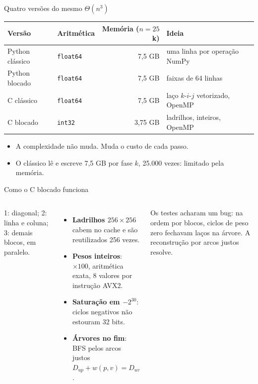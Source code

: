 \documentclass[10pt,aspectratio=169]{beamer}
\begin{document}
\begin{frame}{Quatro versões do mesmo \(\Theta(n^3)\)}
\centering
\begin{tabular}{llrl}
\toprule
Versão & Aritmética & Memória (\(n=25\)k) & Ideia \\
\midrule
Python clássico & \texttt{float64} & 7,5 GB & uma linha por operação NumPy \\
Python blocado & \texttt{float64} & 7,5 GB & faixas de 64 linhas \\
C clássico & \texttt{float64} & 7,5 GB & laço \(k\)-\(i\)-\(j\) vetorizado, OpenMP \\
\alert{C blocado} & \texttt{int32} & \alert{3,75 GB} & ladrilhos, inteiros, OpenMP \\
\bottomrule
\end{tabular}
\par\bigskip
\begin{itemize}
\item A complexidade não muda. Muda o custo de cada passo.
\item O clássico lê e escreve 7,5 GB por fase \(k\), 25.000 vezes: \alert{limitado pela memória}.
\end{itemize}
\end{frame}

\begin{frame}{Como o C blocado funciona}
\begin{columns}[T,onlytextwidth]
\centering
{}\par
\footnotesize 1: diagonal; 2: linha e coluna; 3: demais blocos, em paralelo.
\begin{itemize}
\item \textbf{Ladrilhos \(256\times256\)} cabem no cache e são reutilizados 256 vezes.
\item \textbf{Pesos inteiros}: \(\times100\), aritmética exata, 8 valores por instrução AVX2.
\item \textbf{Saturação em \(-2^{30}\)}: ciclos negativos não estouram 32 bits.
\item \textbf{Árvores no fim}: BFS pelos arcos justos \(D_{up}+w(p,v)=D_{uv}\).
\end{itemize}
\medskip
\small\alert{Os testes acharam um bug:} na ordem por blocos, ciclos de peso zero fechavam laços na árvore. A reconstrução por arcos justos resolve.
\end{columns}
\end{frame}
\end{document}
